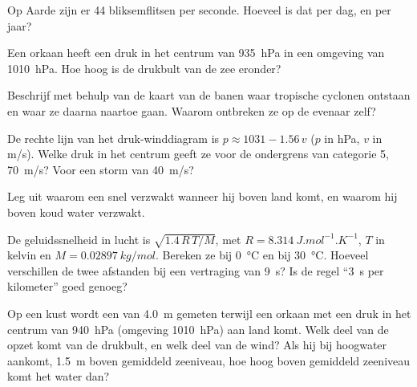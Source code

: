 \begin{exercise}[$\star\star$]\label{exo:g10:storms-and-cyclones:7}
Op Aarde zijn er 44 bliksemflitsen per seconde. Hoeveel is dat per dag, en per
jaar?
\end{exercise}

\begin{exercise}[$\star\star$]\label{exo:g10:storms-and-cyclones:8}
Een orkaan heeft een druk in het centrum van \qty{935}{hPa} in een omgeving van
\qty{1010}{hPa}. Hoe hoog is de drukbult van de zee eronder?
\end{exercise}

\begin{exercise}[$\star\star$]\label{exo:g10:storms-and-cyclones:9}
Beschrijf met behulp van de kaart van de banen waar tropische cyclonen ontstaan
en waar ze daarna naartoe gaan. Waarom ontbreken ze op de evenaar zelf?
\end{exercise}

\begin{exercise}[$\star\star$]\label{exo:g10:storms-and-cyclones:10}
De rechte lijn van het druk-winddiagram is $p \approx 1031 - 1.56\,v$
($p$ in \unit{hPa}, $v$ in \unit{m/s}). Welke druk in het centrum geeft ze voor
de ondergrens van categorie 5, \qty{70}{m/s}? Voor een storm van
\qty{40}{m/s}?
\end{exercise}

\begin{exercise}[$\star\star$]\label{exo:g10:storms-and-cyclones:11}
Leg uit waarom een  snel verzwakt wanneer hij boven land komt,
en waarom hij boven koud water verzwakt.
\end{exercise}

\begin{exercise}[$\star\star\star$]\label{exo:g10:storms-and-cyclones:12}
De geluidssnelheid in lucht is $\sqrt{1.4\,R\,T/M}$, met $R =
\qty{8.314}{J.mol^{-1}.K^{-1}}$, $T$ in kelvin en $M =
\qty{0.02897}{kg/mol}$. Bereken ze bij \qty{0}{\degreeCelsius} en bij
\qty{30}{\degreeCelsius}. Hoeveel verschillen de twee afstanden bij een
vertraging van \qty{9}{s}? Is de regel ``\qty{3}{s} per kilometer'' goed genoeg?
\end{exercise}

\begin{exercise}[$\star\star\star$]\label{exo:g10:storms-and-cyclones:13}
Op een kust wordt een  van \qty{4.0}{m} gemeten terwijl een orkaan met
een druk in het centrum van \qty{940}{hPa} (omgeving \qty{1010}{hPa}) aan land
komt. Welk deel van de opzet komt van de drukbult, en welk deel van de wind? Als
hij bij hoogwater aankomt, \qty{1.5}{m} boven gemiddeld zeeniveau, hoe hoog
boven gemiddeld zeeniveau komt het water dan?
\end{exercise}

